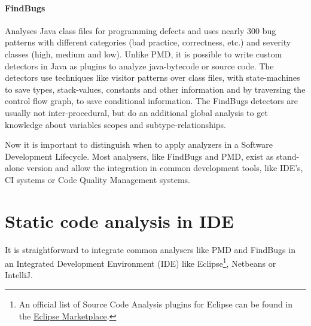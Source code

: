\documentclass[conference]{IEEEtran}
\begin{document}
\paragraph{FindBugs}
Analyses Java class files for programming defects and uses nearly 300 bug patterns with different categories (bad practice, correctness, etc.) and severity classes (high, medium and low)\cite{Findbugs}.
Unlike PMD, it is possible to write custom detectors in Java as plugins to analyze java-bytecode or source code.
The detectors use techniques like visitor patterns over class files, with state-machines to save types, stack-values, constants and other information and by traversing the control flow graph, to save conditional information.
The FindBugs detectors are usually not inter-procedural, but do an additional global analysis to get knowledge about variables scopes and subtype-relationships.


Now it is important to distinguish when to apply analyzers in a Software Development Lifecycle.
Most analysers, like FindBugs and PMD, exist as stand-alone version and allow the integration in common development tools, like IDE's, CI systems or Code Quality Management systems.







\section{Static code analysis in IDE}
\label{sec:static_code_analysis_ide}
It is straightforward to integrate common analysers like PMD and FindBugs in an Integrated Development Environment (IDE) like Eclipse\footnote{An official list of Source Code Analysis plugins for Eclipse can be found in the \href{http://marketplace.eclipse.org/taxonomy/term/14,31}{Eclipse Marketplace}.}, Netbeans or IntelliJ.
\end{document}
